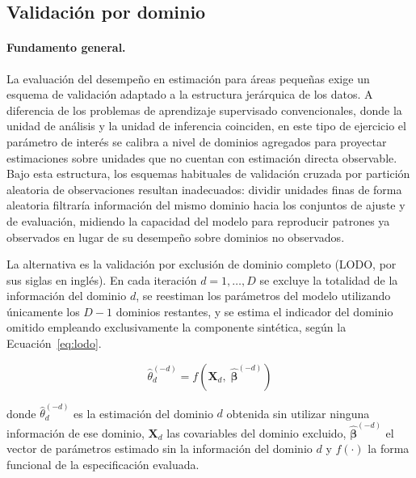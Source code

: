 \subsection{Validación por dominio}
\label{subsec:validacion}

\paragraph{Fundamento general.}
La evaluación del desempeño en estimación para áreas pequeñas exige un esquema de validación adaptado a la estructura jerárquica de los datos. A diferencia de los problemas de aprendizaje supervisado convencionales, donde la unidad de análisis y la unidad de inferencia coinciden, en este tipo de ejercicio el parámetro de interés se calibra a nivel de dominios agregados para proyectar estimaciones sobre unidades que no cuentan con estimación directa observable. Bajo esta estructura, los esquemas habituales de validación cruzada por partición aleatoria de observaciones resultan inadecuados: dividir unidades finas de forma aleatoria filtraría información del mismo dominio hacia los conjuntos de ajuste y de evaluación, midiendo la capacidad del modelo para reproducir patrones ya observados en lugar de su desempeño sobre dominios no observados.

La alternativa es la validación por exclusión de dominio completo (LODO, por sus siglas en inglés). En cada iteración $d = 1, \dots, D$ se excluye la totalidad de la información del dominio $d$, se reestiman los parámetros del modelo utilizando únicamente los $D-1$ dominios restantes, y se estima el indicador del dominio omitido empleando exclusivamente la componente sintética, según la Ecuación~\ref{eq:lodo}.

\begin{equation}
    \hat{\theta}_d^{(-d)} = f\!\left(\mathbf{X}_d,\; \hat{\boldsymbol{\beta}}^{(-d)}\right)
    \label{eq:lodo}
\end{equation}

\noindent donde $\hat{\theta}_d^{(-d)}$ es la estimación del dominio $d$ obtenida sin utilizar ninguna información de ese dominio, $\mathbf{X}_d$ las covariables del dominio excluido, $\hat{\boldsymbol{\beta}}^{(-d)}$ el vector de parámetros estimado sin la información del dominio $d$ y $f(\cdot)$ la forma funcional de la especificación evaluada.

